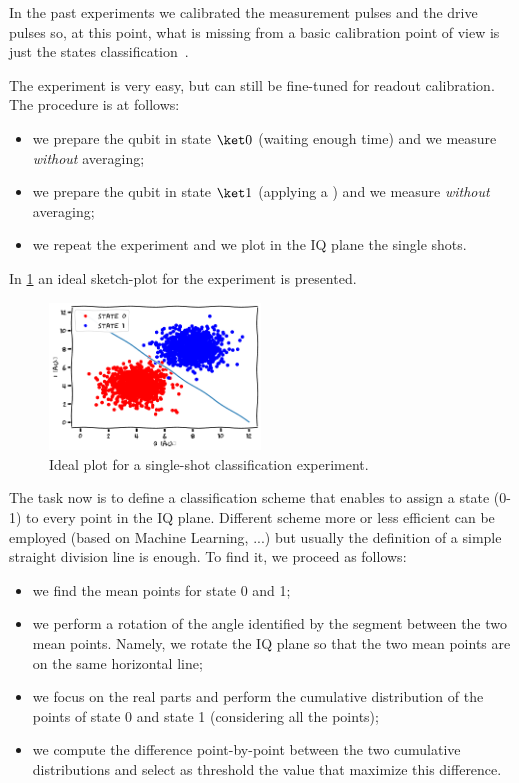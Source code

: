 
In the past experiments we calibrated the measurement pulses and the drive pulses so, at this point, what is missing from a basic calibration point of view is just the states classification~\cite{Caban2015, Dietrich2022}.

The experiment is very easy, but can still be fine-tuned for readout calibration.
The procedure is at follows:
\begin{itemize}
    \item we prepare the qubit in state $\ket 0$ (waiting enough time) and we measure \textit{without} averaging;
    \item we prepare the qubit in state $\ket 1$ (applying a \pipulse) and we measure \textit{without} averaging;
    \item we repeat the experiment and we plot in the IQ plane the single shots.
\end{itemize}

In \cref{fig:sketch_single_shot_class} an ideal sketch-plot for the experiment is presented.

\begin{figure}[ht]
    \centering
    \includegraphics[width=0.5\textwidth]{characterization/figures/classification_sketch.pdf}
    \caption{Ideal plot for a single-shot classification experiment.}
    \label{fig:sketch_single_shot_class}
\end{figure}

The task now is to define a classification scheme that enables to assign a state (0-1) to every point in the IQ plane. 
Different scheme more or less efficient can be employed (based on Machine Learning, ...) but usually the definition of a simple straight division line is enough.
To find it, we proceed as follows:
\begin{itemize}
    \item we find the mean points for state 0 and 1;
    \item we perform a rotation of the angle identified by the segment between the two mean points. Namely, we rotate the IQ plane so that the two mean points are on the same horizontal line;
    \item we focus on the real parts and perform the cumulative distribution of the points of state 0 and state 1 (considering all the points);
    \item we compute the difference point-by-point between the two cumulative distributions and select as threshold the value that maximize this difference.
\end{itemize}

